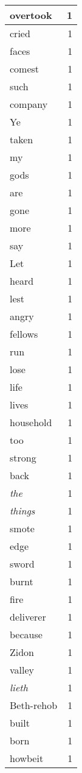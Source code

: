 \begin{center}
\begin{longtable}{l|r}
overtook & 1\\ \hline 
cried & 1\\ \hline 
faces & 1\\ \hline 
comest & 1\\ \hline 
such & 1\\ \hline 
company & 1\\ \hline 
Ye & 1\\ \hline 
taken & 1\\ \hline 
my & 1\\ \hline 
gods & 1\\ \hline 
are & 1\\ \hline 
gone & 1\\ \hline 
more & 1\\ \hline 
say & 1\\ \hline 
Let & 1\\ \hline 
heard & 1\\ \hline 
lest & 1\\ \hline 
angry & 1\\ \hline 
fellows & 1\\ \hline 
run & 1\\ \hline 
lose & 1\\ \hline 
life & 1\\ \hline 
lives & 1\\ \hline 
household & 1\\ \hline 
too & 1\\ \hline 
strong & 1\\ \hline 
back & 1\\ \hline 
\emph{the} & 1\\ \hline 
\emph{things} & 1\\ \hline 
smote & 1\\ \hline 
edge & 1\\ \hline 
sword & 1\\ \hline 
burnt & 1\\ \hline 
fire & 1\\ \hline 
deliverer & 1\\ \hline 
because & 1\\ \hline 
Zidon & 1\\ \hline 
valley & 1\\ \hline 
\emph{lieth} & 1\\ \hline 
Beth-rehob & 1\\ \hline 
built & 1\\ \hline 
born & 1\\ \hline 
howbeit & 1\\ \hline 

\end{longtable}
\end{center}
